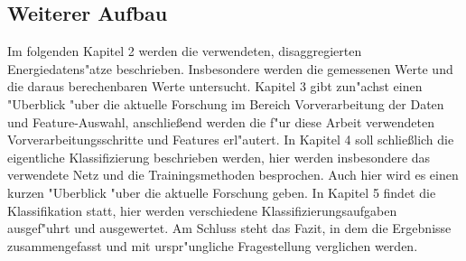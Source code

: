 \subsection{Weiterer Aufbau}
\label{Weiterer Aufbau}
	Im folgenden Kapitel 2 werden die verwendeten, disaggregierten Energiedatens"atze beschrieben. Insbesondere werden die gemessenen Werte und die daraus berechenbaren Werte untersucht. 
	Kapitel 3 gibt zun"achst einen "Uberblick "uber die aktuelle Forschung im Bereich Vorverarbeitung der Daten und Feature-Auswahl, anschlie{\ss}end werden die f"ur diese Arbeit verwendeten Vorverarbeitungsschritte und Features erl"autert.
	In Kapitel 4 soll schlie{\ss}lich die eigentliche Klassifizierung beschrieben werden, hier werden insbesondere das verwendete Netz und die Trainingsmethoden besprochen. Auch hier wird es einen kurzen "Uberblick "uber die aktuelle Forschung geben.
	In Kapitel 5 findet die Klassifikation statt, hier werden verschiedene Klassifizierungsaufgaben ausgef"uhrt und ausgewertet. 
	Am Schluss steht das Fazit, in dem die Ergebnisse zusammengefasst und mit urspr"ungliche Fragestellung verglichen werden. 